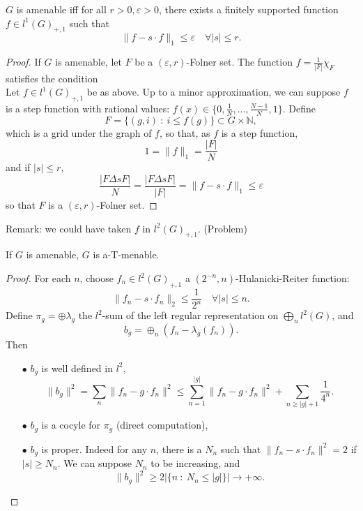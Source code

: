 \begin{thm}
$G$ is amenable iff for all $r>0,\varepsilon >0$, there exists a finitely supported function $f\in l^1(G)_{+,1}$ such that 
\[ \| f -s\cdot f\|_1 \leq \varepsilon \quad \forall |s|\leq r. \]
\end{thm}
\begin{proof}
If $G$ is amenable, let $F$ be a $(\varepsilon, r)$-Folner set. The function $f=\frac{1}{|F|}\chi_F$ satisfies the condition\\

Let $f\in l^1(G)_{+,1}$ be as above. Up to a minor approximation, we can suppose $f$ is a step function with rational values: $f(x)\in \{0, \frac{1}{N}, ... , \frac{N-1}{N}, 1\}$. Define
\[F = \{ (g,i) \ : \ i\leq f(g)\} \subset G\times \mathbb N,\]
which is a grid under the graph of $f$, so that, as $f$ is a step function, 
\[1 = \| f \|_1 = \frac{|F|}{N}\]
and if $|s|\leq r$,
\[\frac{|F\Delta sF|}{N} = \frac{|F\Delta sF|}{|F|}= \|f- s\cdot f\|_1 \leq \varepsilon\]
so that $F$ is a $(\varepsilon, r)$-Folner set.
\end{proof}

Remark: we could have taken $f$ in $l^2(G)_{+,1}$. (Problem)

\begin{cor}
If $G$ is amenable, $G$ is a-T-menable.
\end{cor}

\begin{proof}
For each $n$, choose $f_n\in l^2(G)_{+,1}$ a $(2^{-n},n)$-Hulanicki-Reiter function:
\[\|f_n-s\cdot f_n\|_2 \leq \frac{1}{2^n} \quad \forall |s|\leq n.\]
Define $\pi_g = \oplus \lambda_g$ the $l^2$-sum of the left regular representation on $\bigoplus_n l^2(G)$, and 
\[b_g = \oplus_n (f_n - \lambda_g(f_n)).\]
Then 
\begin{itemize}
\item[$\bullet$] $b_g$ is well defined in $l^2$,
\[ \|b_g\|^2 = \sum_n \|f_n - g\cdot f_n\|^2 \leq \sum_{n= 1}^{|g|}\|f_n - g\cdot f_n\|^2 + \sum_{n\geq |g|+1} \frac{1}{4^n}. \]
\item[$\bullet$] $b_g$ is a cocyle for $\pi_g$ (direct computation),
\item[$\bullet$] $b_g$ is proper. Indeed for any $n$, there is a $N_n$ such that $\|f_n -s\cdot f_n\|^2 = 2$ if $|s|\geq N_n$. We can suppose $N_n$ to be increasing, and 
\[\|b_g\|^2 \geq 2|\{n \ : \ N_n \leq |g|\}| \rightarrow +\infty.\]
\end{itemize}
\end{proof}

